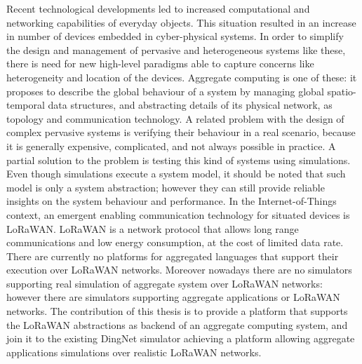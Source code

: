 Recent technological developments led to increased computational and networking capabilities of everyday objects. 
This situation resulted in an increase in number of devices embedded in cyber-physical systems.
In order to simplify the design and management of pervasive and heterogeneous systems like these, there is need for new high-level paradigms able to capture concerns like heterogeneity and location of the devices.
Aggregate computing is one of these: it proposes to describe the global behaviour of a system by managing global spatio-temporal data structures, and abstracting details of its physical network, as topology and communication technology.
A related problem with the design of complex pervasive systems is verifying their behaviour in a real scenario, because it is generally expensive, complicated, and not always possible in practice.
A partial solution to the problem is testing this kind of systems using simulations.
Even though simulations execute a system model, it should be noted that such model is only a system abstraction; however they can still provide reliable insights on the system behaviour and performance.
In the Internet-of-Things context, an emergent enabling communication technology for situated devices is LoRaWAN.
LoRaWAN is a network protocol that allows long range communications and low energy consumption, at the cost of limited data rate.
There are currently no platforms for aggregated languages that support their execution over LoRaWAN networks.
Moreover nowadays there are no simulators supporting real simulation of aggregate system over \mbox{LoRaWAN} networks: however there are simulators supporting aggregate applications or \mbox{LoRaWAN} networks.
The contribution of this thesis is to provide a platform that supports the LoRaWAN abstractions as backend of an aggregate computing system, and join it to the existing DingNet simulator achieving a platform allowing aggregate applications simulations over realistic LoRaWAN networks. 

